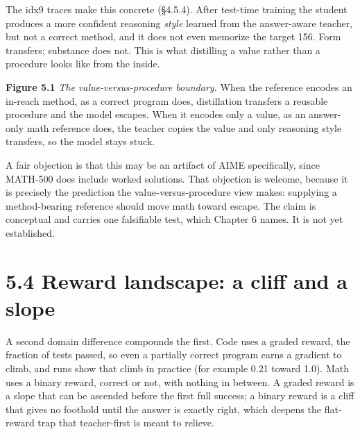 The idx9 traces make this concrete (§4.5.4). After test-time training the student produces a more confident reasoning \emph{style} learned from the answer-aware teacher, but not a correct method, and it does not even memorize the target 156. Form transfers; substance does not. This is what distilling a value rather than a procedure looks like from the inside.

\begin{center}\end{center}

\textbf{Figure 5.1}
\emph{The value-versus-procedure boundary.} When the reference encodes an in-reach method, as a correct program does, distillation transfers a reusable procedure and the model escapes. When it encodes only a value, as an answer-only math reference does, the teacher copies the value and only reasoning style transfers, so the model stays stuck.

A fair objection is that this may be an artifact of AIME specifically, since MATH-500 does include worked solutions. That objection is welcome, because it is precisely the prediction the value-versus-procedure view makes: supplying a method-bearing reference should move math toward escape. The claim is conceptual and carries one falsifiable test, which Chapter 6 names. It is not yet established.

\section{5.4 Reward landscape: a cliff and a slope}\label{reward-landscape-a-cliff-and-a-slope}

A second domain difference compounds the first. Code uses a graded reward, the fraction of tests passed, so even a partially correct program earns a gradient to climb, and runs show that climb in practice (for example 0.21 toward 1.0). Math uses a binary reward, correct or not, with nothing in between. A graded reward is a slope that can be ascended before the first full success; a binary reward is a cliff that gives no foothold until the answer is exactly right, which deepens the flat-reward trap that teacher-first is meant to relieve.

